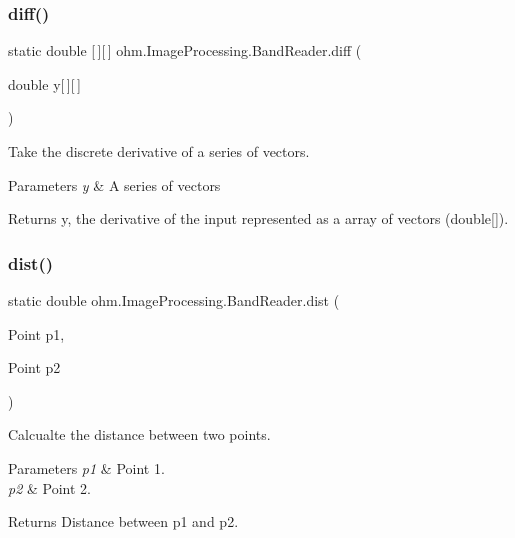 \subsubsection{\texorpdfstring{diff()}{diff()}}
{\footnotesize\ttfamily static double \mbox{[}$\,$\mbox{]}\mbox{[}$\,$\mbox{]} ohm.\+Image\+Processing.\+Band\+Reader.\+diff (\begin{DoxyParamCaption}\item[{double}]{y\mbox{[}$\,$\mbox{]}\mbox{[}$\,$\mbox{]} }\end{DoxyParamCaption})\hspace{0.3cm}{\ttfamily [static]}}

Take the discrete derivative of a series of vectors. 
\begin{DoxyParams}{Parameters}
{\em y} & A series of vectors \\
\hline
\end{DoxyParams}
\begin{DoxyReturn}{Returns}
y\textquotesingle{}, the derivative of the input represented as a array of vectors (double\mbox{[}\mbox{]}). 
\end{DoxyReturn}
\hypertarget{classohm_1_1_image_processing_1_1_band_reader_aa3ef8a552a5abc52201bd0e9f9eeb900}{}\label{classohm_1_1_image_processing_1_1_band_reader_aa3ef8a552a5abc52201bd0e9f9eeb900} 
\subsubsection{\texorpdfstring{dist()}{dist()}}
{\footnotesize\ttfamily static double ohm.\+Image\+Processing.\+Band\+Reader.\+dist (\begin{DoxyParamCaption}\item[{Point}]{p1,  }\item[{Point}]{p2 }\end{DoxyParamCaption})\hspace{0.3cm}{\ttfamily [static]}}

Calcualte the distance between two points. 
\begin{DoxyParams}{Parameters}
{\em p1} & Point 1. \\
\hline
{\em p2} & Point 2. \\
\hline
\end{DoxyParams}
\begin{DoxyReturn}{Returns}
Distance between p1 and p2. 
\end{DoxyReturn}
\hypertarget{classohm_1_1_image_processing_1_1_band_reader_ac2ee0b6de8f02e13da47d02c5d7a1bc8}{}\label{classohm_1_1_image_processing_1_1_band_reader_ac2ee0b6de8f02e13da47d02c5d7a1bc8} 
